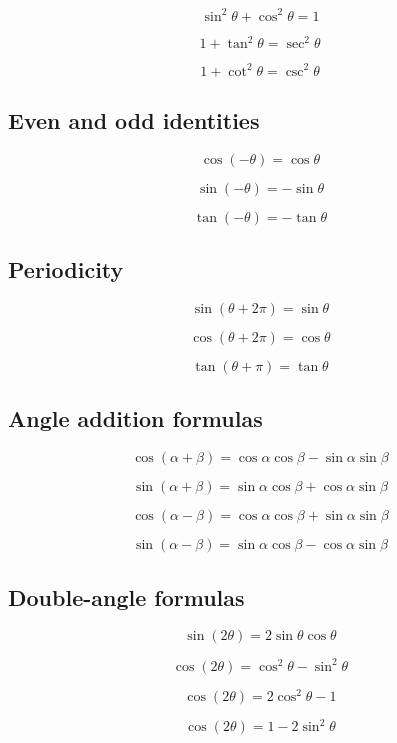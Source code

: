 \[
\boxed{
    \sin^2\theta+\cos^2\theta=1
}
\]

\[
\boxed{
    1+\tan^2\theta=\sec^2\theta
}
\]

\[
\boxed{
    1+\cot^2\theta=\csc^2\theta
}
\]

\subsection*{Even and odd identities}

\[
\boxed{
    \cos(-\theta)=\cos\theta
}
\]

\[
\boxed{
    \sin(-\theta)=-\sin\theta
}
\]

\[
\boxed{
    \tan(-\theta)=-\tan\theta
}
\]

\subsection*{Periodicity}

\[
\boxed{
    \sin(\theta+2\pi)=\sin\theta
}
\]

\[
\boxed{
    \cos(\theta+2\pi)=\cos\theta
}
\]

\[
\boxed{
    \tan(\theta+\pi)=\tan\theta
}
\]

\subsection*{Angle addition formulas}

\[
\boxed{
    \cos(\alpha+\beta)
    =
    \cos\alpha\cos\beta-\sin\alpha\sin\beta
}
\]

\[
\boxed{
    \sin(\alpha+\beta)
    =
    \sin\alpha\cos\beta+\cos\alpha\sin\beta
}
\]

\[
\boxed{
    \cos(\alpha-\beta)
    =
    \cos\alpha\cos\beta+\sin\alpha\sin\beta
}
\]

\[
\boxed{
    \sin(\alpha-\beta)
    =
    \sin\alpha\cos\beta-\cos\alpha\sin\beta
}
\]

\subsection*{Double-angle formulas}

\[
\boxed{
    \sin(2\theta)=2\sin\theta\cos\theta
}
\]

\[
\boxed{
    \cos(2\theta)=\cos^2\theta-\sin^2\theta
}
\]

\[
\boxed{
    \cos(2\theta)=2\cos^2\theta-1
}
\]

\[
\boxed{
    \cos(2\theta)=1-2\sin^2\theta
}
\]

